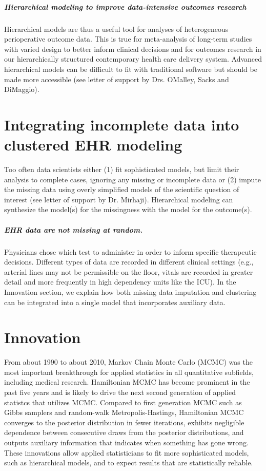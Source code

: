 \documentclass[11pt,notitlepage]{article}
\begin{document}
\subparagraph*{Hierarchical modeling to improve data-intensive outcomes research}
Hierarchical models are thus a useful tool for analyses of
heterogeneous perioperative outcome data. This is true for meta-analysis 
of long-term studies with varied design to better inform clinical 
decisions\cite{AndreaeJohnsonAbstract2013,Spiegelhalter2004bayesian} and 
for outcomes research in our hierarchically structured contemporary health care delivery system. 
Advanced hierarchical models can be difficult to fit with traditional software but should be 
made more accessible (see letter of support by Drs. OMalley, Sacks and DiMaggio).

\section*{Integrating incomplete data into clustered EHR modeling}
Too often data scientists either (1) fit sophisticated models, but limit their analysis 
to complete cases, ignoring any missing or incomplete data or (2) impute the missing 
data using overly simplified models of the scientific question of interest (see letter of 
support by Dr. Mirhaji). Hierarchical modeling can synthesize the model(s) for the missingness
with the model for the outcome(s).

\subparagraph*{EHR data are not missing at random.}
Physicians chose which test to administer in order
to inform specific therapeutic decisions. Different types of data are recorded 
in different clinical settings (e.g., arterial lines may not be permissible on the 
floor, vitals are recorded in greater detail and more frequently in high dependency 
units like the ICU). In the Innovation section, we explain how both missing data 
imputation and clustering can be integrated into a single model that 
incorporates auxiliary data.

\section*{Innovation}

From about 1990 to about 2010, Markov Chain Monte Carlo (MCMC) was the most
important breakthrough for applied statistics in all quantitative subfields,
including medical research. Hamiltonian MCMC has become prominent in the 
past five years and is likely to drive the next second generation of applied
statistcs that utilizes MCMC. Compared to first generation MCMC such as 
Gibbs samplers and random-walk Metropolis-Hastings, Hamiltonian MCMC converges
to the posterior distribution in fewer iterations, exhibits negligible dependence
between consecutive draws from the posterior distributions, and outputs auxiliary
information that indicates when something has gone wrong. These innovations allow
applied statisticians to fit more sophisticated models, such as hierarchical models,
and to expect results that are statistically reliable.
\end{document}
